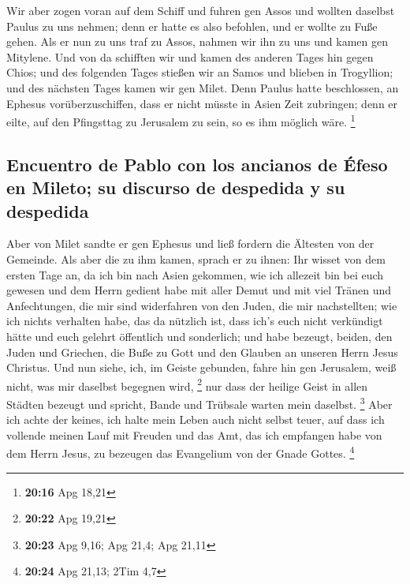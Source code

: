  Wir aber zogen voran auf dem Schiff und fuhren gen Assos
und wollten daselbst Paulus zu uns nehmen; denn er hatte es also
befohlen, und er wollte zu Fuße gehen.  Als er nun zu uns
traf zu Assos, nahmen wir ihn zu uns und kamen gen Mitylene.
 Und von da schifften wir und kamen des anderen Tages hin
gegen Chios; und des folgenden Tages stießen wir an Samos und blieben in
Trogyllion; und des nächsten Tages kamen wir gen Milet. 
Denn Paulus hatte beschlossen, an Ephesus vorüberzuschiffen, dass er
nicht müsste in Asien Zeit zubringen; denn er eilte, auf den Pfingsttag
zu Jerusalem zu sein, so es ihm möglich wäre. \footnote{\textbf{20:16}
  Apg 18,21}

\hypertarget{encuentro-de-pablo-con-los-ancianos-de-uxe9feso-en-mileto-su-discurso-de-despedida-y-su-despedida}{%
\subsection{Encuentro de Pablo con los ancianos de Éfeso en Mileto; su
discurso de despedida y su
despedida}\label{encuentro-de-pablo-con-los-ancianos-de-uxe9feso-en-mileto-su-discurso-de-despedida-y-su-despedida}}

 Aber von Milet sandte er gen Ephesus und ließ fordern
die Ältesten von der Gemeinde.  Als aber die zu ihm
kamen, sprach er zu ihnen: Ihr wisset von dem ersten Tage an, da ich bin
nach Asien gekommen, wie ich allezeit bin bei euch gewesen
 und dem Herrn gedient habe mit aller Demut und mit viel
Tränen und Anfechtungen, die mir sind widerfahren von den Juden, die mir
nachstellten;  wie ich nichts verhalten habe, das da
nützlich ist, dass ich's euch nicht verkündigt hätte und euch gelehrt
öffentlich und sonderlich;  und habe bezeugt, beiden, den
Juden und Griechen, die Buße zu Gott und den Glauben an unseren Herrn
Jesus Christus.  Und nun siehe, ich, im Geiste gebunden,
fahre hin gen Jerusalem, weiß nicht, was mir daselbst begegnen wird,
\footnote{\textbf{20:22} Apg 19,21}  nur dass der heilige
Geist in allen Städten bezeugt und spricht, Bande und Trübsale warten
mein daselbst. \footnote{\textbf{20:23} Apg 9,16; Apg 21,4; Apg 21,11}
 Aber ich achte der keines, ich halte mein Leben auch
nicht selbst teuer, auf dass ich vollende meinen Lauf mit Freuden und
das Amt, das ich empfangen habe von dem Herrn Jesus, zu bezeugen das
Evangelium von der Gnade Gottes. \footnote{\textbf{20:24} Apg 21,13;
  2Tim 4,7}

